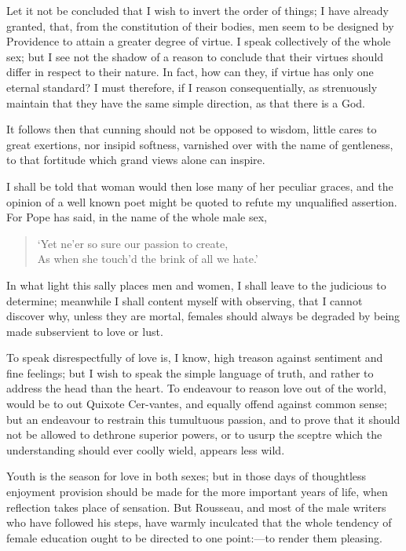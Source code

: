 Let it not be concluded that I wish to invert the order of things; I
have already granted, that, from the constitution of their bodies, men
seem to be designed by Providence to attain a greater degree of
virtue. I speak collectively of the whole sex; but I see not the
shadow of a reason to conclude that their virtues should differ in
respect to their nature. In fact, how can they, if virtue has only one
eternal standard? I must therefore, if I reason consequentially, as
strenuously maintain that they have the same simple direction, as that
there is a God.

It follows then that cunning should not be opposed to wisdom,
little cares to great exertions, nor insipid softness, varnished over
with the name of gentleness, to that fortitude which grand views alone
can inspire.

I shall be told that woman would then lose many of her peculiar
graces, and the opinion of a well known poet might be quoted to refute
my unqualified assertion. For Pope has said, in the name of the whole
male sex,

\begin{verse}
`Yet ne'er so sure our passion to create,\\
As when she touch'd the brink of all we hate.'
\end{verse}

In what light this sally places men and women, I shall leave to the
judicious to determine; meanwhile I shall content myself with
observing, that I cannot discover why, unless they are mortal, females
should always be degraded by being made subservient to love or lust.

To speak disrespectfully of love is, I know, high treason against
sentiment and fine feelings; but I wish to speak the simple language
of truth, and rather to address the head than the heart. To endeavour
to reason love out of the world, would be to out Quixote
Cer-vantes, and equally offend against common sense; but an
endeavour to restrain this tumultuous passion, and to prove that it
should not be allowed to dethrone superior powers, or to usurp the
sceptre which the understanding should ever coolly wield, appears less
wild.

Youth is the season for love in both sexes; but in those days of
thoughtless enjoyment provision should be made for the more important
years of life, when reflection takes place of sensation. But Rousseau,
and most of the male writers who have followed his steps, have warmly
inculcated that the whole tendency of female education ought to be
directed to one point:---to render them pleasing.

